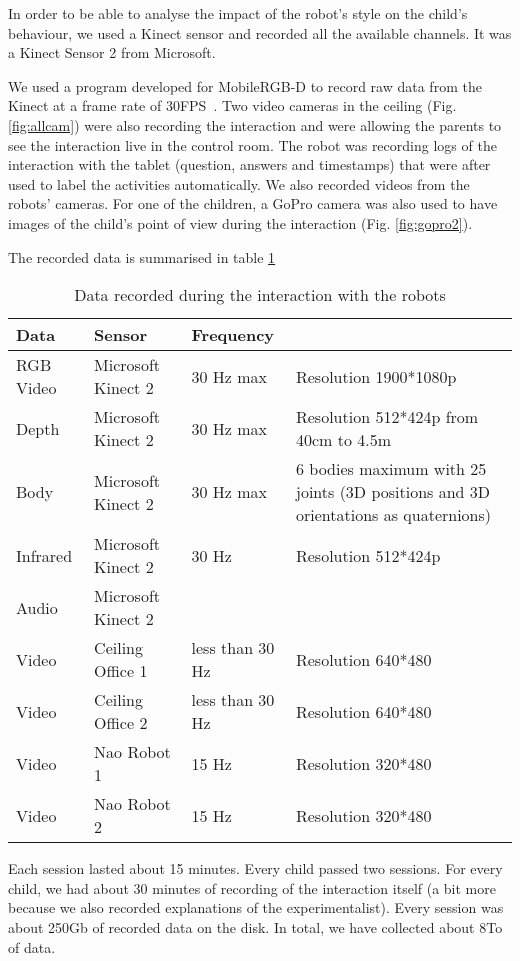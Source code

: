\documentclass[a4paper,twocolumn]{svjour3}
\begin{document}
In order to be able to analyse the impact of the robot's style on the child's behaviour, we used a Kinect sensor and recorded all the available channels. 
It was a Kinect Sensor 2 from Microsoft. 

We used a program developed for MobileRGB-D to record raw data from the Kinect at a frame rate of 30FPS~\cite{MobileRGB}. 
Two video cameras in the ceiling (Fig. \ref{fig:allcam})  were also recording the interaction and were allowing the parents to see the interaction live in the control room. 
The robot was recording logs of the interaction with the tablet (question, answers and timestamps) that were after used to label the activities  automatically.  
We also recorded videos from the robots' cameras. 
For one of the children, a GoPro camera was also used to have images of the child's point of view during the interaction (Fig. \ref{fig:gopro2}).




The recorded data is summarised in table \ref{tab:dataset}
\begin{table}[h]
	\centering
	\caption{Data recorded during the interaction with the robots}
	\begin{tabular}{l p{1cm} p{1.5cm} p{2.5cm}}
		\hline
		Data  & Sensor & Frequency & \\ \hline
		RGB Video & Microsoft Kinect 2 & 30 Hz max & Resolution 1900*1080p \\
		Depth & Microsoft Kinect 2 & 30 Hz max & Resolution 512*424p from 40cm to 4.5m \\
		Body & Microsoft Kinect 2 & 30 Hz max & 6 bodies maximum with 25 joints (3D positions and 3D orientations as quaternions)\\
		Infrared & Microsoft Kinect 2 & 30 Hz & Resolution 512*424p \\ 
		Audio & Microsoft Kinect 2 &  &  \\
		\hline
		Video & Ceiling Office 1 & less than 30 Hz & Resolution 640*480 \\
		Video & Ceiling Office 2 & less than 30 Hz & Resolution 640*480 \\
		\hline
		Video & Nao Robot 1 & 15 Hz & Resolution 320*480 \\
		Video & Nao Robot 2 & 15 Hz & Resolution 320*480 \\
		\hline
	\end{tabular}
	\label{tab:dataset}
\end{table}


Each session lasted about 15 minutes. 
Every child passed two sessions. 
For every child, we had about 30 minutes of recording of the interaction itself (a bit more because we also recorded explanations of the experimentalist). 
Every session was about 250Gb of recorded data on the disk. 
In total, we have collected about 8To of data. 
\end{document}
